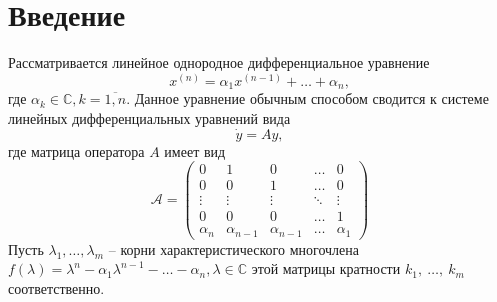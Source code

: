 \section{Введение}
Рассматривается линейное однородное дифференциальное уравнение
$$
	x^{(n)} = \alpha_{1}x^{(n-1)} + \ldots + \alpha_{n}, 
$$
где $\alpha_{k} \in \mathbb{C}, k = \overline{1,n}$. Данное уравнение обычным способом сводится к системе
линейных дифференциальных уравнений вида
$$
	\dot{y} = Ay,
$$
где матрица оператора $A$ имеет вид
$$
	\mathcal{A} = \begin{pmatrix}
		0 & 1 & 0 & \dots & 0 \\
		0 & 0 & 1 & \dots & 0 \\
		\vdots & \vdots & \vdots & \ddots & \vdots \\
		0 & 0 & 0 & \dots & 1 \\
		\alpha_n & \alpha_{n-1} & \alpha_{n-1} & \dots & \alpha_1
	\end{pmatrix}
$$
Пусть $\lambda_{1}, \ldots, \lambda_{m}$ -- корни характеристического многочлена\\
$f(\lambda) = \lambda^{n} - \alpha_{1}\lambda^{n-1} - \ldots - \alpha_{n}, \lambda \in \mathbb{C}$ этой матрицы
кратности $k_1,~\ldots,~k_m$ соответственно.